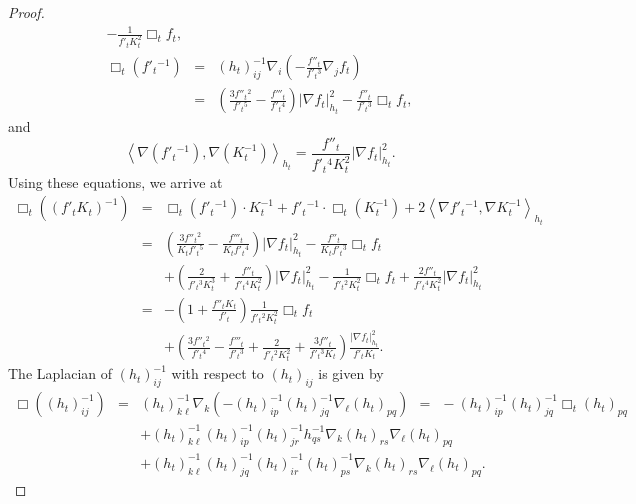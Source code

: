 \documentclass{amsart}
\theoremstyle{definition}
\theoremstyle{remark}
\numberwithin{equation}{section}
\begin{document}
\begin{proof}
\begin{eqnarray*}
-\frac{1}{f'_{t}K^{2}_{t}}\Box_{t} f_{t},\\
\Box_{t}(f'_{t}{}^{-1})&=&(h_{t})^{-1}_{ij}\nabla_{i}\left(-\frac{f''_{t}}{f'_{t}{}^{3}}\nabla_{j}
f_{t}\right)\\
&=&\left(\frac{3f''_{t}{}^{2}}{f'_{t}{}^{5}}-\frac{f'''_{t}}{f'_{t}{}^{4}}\right)|\nabla f_{t}|^{2}_{h_{t}}-\frac{f''_{t}}{f'_{t}{}^{3}}\Box_{t} f_{t},
\end{eqnarray*}
and
\begin{equation*}
\left\langle\nabla(f'_{t}{}^{-1}),\nabla(K^{-1}_{t})\right\rangle_{h_{t}}
=\frac{f''_{t}}{f'_{t}{}^{4}K^{2}_{t}}|\nabla f_{t}|^{2}_{h_{t}}.
\end{equation*}
Using these equations, we arrive at
\begin{eqnarray*}
\Box_{t}\left((f'_{t}K_{t})^{-1}\right)&=&\Box_{t}(f'_{t}{}^{-1})\cdot K^{-1}_{t}+f'_{t}{}^{-1}\cdot\Box_{t}(K^{-1}_{t})
+2\left\langle\nabla f'_{t}{}^{-1},\nabla K^{-1}_{t}\right\rangle_{h_{t}}\\
&=&\left(\frac{3f''_{t}{}^{2}}{K_{t}f'_{t}{}^{5}}-\frac{f'''_{t}}{K_{t}f'_{t}{}^{4}}\right)|\nabla f_{t}|^{2}_{h_{t}}
-\frac{f''_{t}}{K_{t}f'_{t}{}^{3}}\Box_{t} f_{t}\\
&&+\left(\frac{2}{f'_{t}{}^{3}K^{3}_{t}}+\frac{f''_{t}}{f'_{t}{}^{4}K^{2}_{t}}
\right)|\nabla f_{t}|^{2}_{h_{t}}-\frac{1}{f'_{t}{}^{2}K^{2}_{t}}\Box_{t} f_{t}
+\frac{2f''_{t}}{f'_{t}{}^{4}K^{2}_{t}}|\nabla f_{t}|^{2}_{h_{t}}\\
&=&-\left(1+\frac{f''_{t}K_{t}}{f'_{t}}\right)\frac{1}{f'_{t}{}^{2}K^{2}_{t}}
\Box_{t} f_{t}\\
&&+\left(\frac{3f''_{t}{}^{2}}{f'_{t}{}^{4}}-\frac{f'''_{t}}{f'_{t}{}^{3}}
+\frac{2}{f'_{t}{}^{2}K^{2}_{t}}+\frac{3f''_{t}}{f'_{t}{}^{3}K_{t}}\right)
\frac{|\nabla f_{t}|^{2}_{h_{t}}}{f'_{t}K_{t}}.
\end{eqnarray*}
The Laplacian of $(h_{t})^{-1}_{ij}$ with respect to $(h_{t})_{ij}$ is given by
\begin{eqnarray*}
\Box\left((h_{t})^{-1}_{ij}\right)&=&(h_{t})^{-1}_{k\ell}\nabla_{k}
\left(-(h_{t})^{-1}_{ip}(h_{t})^{-1}_{jq}\nabla_{\ell}(h_{t})_{pq}\right) \ \ = \ \ -(h_{t})^{-1}_{ip}(h_{t})^{-1}_{jq}\Box_{t} (h_{t})_{pq}\\
&&+(h_{t})^{-1}_{k\ell}(h_{t})^{-1}_{ip}(h_{t})^{-1}_{jr}h^{-1}_{qs}
\nabla_{k}(h_{t})_{rs}\nabla_{\ell}(h_{t})_{pq}\\
&&+(h_{t})^{-1}_{k\ell}(h_{t})^{-1}_{jq}(h_{t})^{-1}_{ir}(h_{t})^{-1}_{ps}
\nabla_{k}(h_{t})_{rs}\nabla_{\ell}(h_{t})_{pq}.
\end{eqnarray*}

\end{proof}
\end{document}
